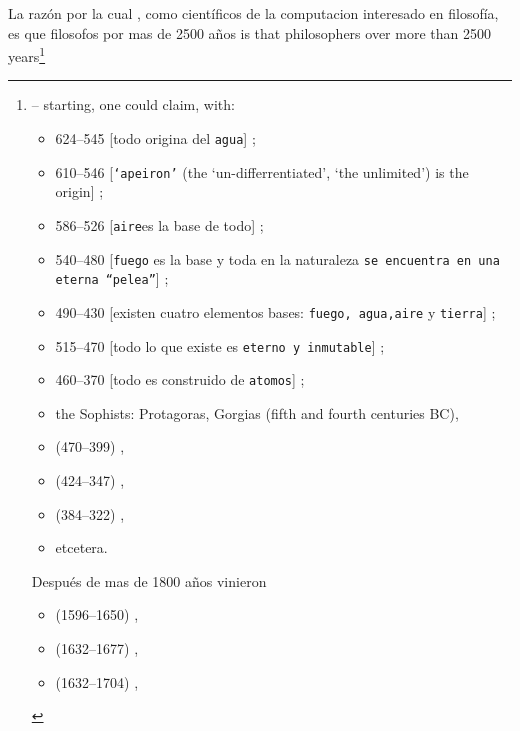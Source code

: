 \mnewfoil
      
\begynd
\pind La razón por la cual , como científicos de la computacion  interesado en filosofía,
\begynd
\pind es que filosofos por mas de 2500 años is that philosophers over more than 2500
      years{\footnote{\LLLL -- \label{citations-1}
      starting, one could claim, with:\scriptsize\footnotesize
\begin{multicols}{2}
\begin{itemize}
\item {} 624--545 [todo origina del 
      {\texttt{agua}}] \cite{Thales:Dines};
\item {} 610--546 [{\texttt{`apeiron'}} (the
      `un\--dif\-fer\-ren\-ti\-a\-ted', `the unlimited') is the
      origin] \cite{Anaximander:Dines};
\item {} 586--526 [{\texttt{aire}}es la base de todo] \cite{Anaximenes:Dines};
\item  {} 540--480 [\texttt{fuego} es la base y toda en la naturaleza {\texttt{se encuentra en una eterna ``pelea''}}]  \cite{Heraklit:Dines};
\item {} 490--430 [existen cuatro elementos bases:
      {\texttt{fuego, agua,aire}} y {\texttt{tierra}}] \cite{Empedokles:Dines};
\item {} 515--470 [todo lo que existe es \texttt{eterno y inmutable}] \cite{Parminedes:Dines};
\item {} 460--370 [todo es construido de {\texttt{atomos}}] \cite{Demokrit:Dines};
\item the Sophists: Protagoras, Gorgias (fifth and fourth centuries BC),
\item {} (470--399) \cite{Socrates:Dines},
\item {} (424--347) \cite{Plato:Dines},
\item {} (384--322) \cite{Aristotle:Dines-x},
\item etcetera.
\end{itemize}
\noindent
Después de mas de 1800 años vinieron 
\begin{itemize}
\item {} (1596--1650) \cite{Descartes:Dines},
\item {} (1632--1677) \cite{Spinoza:Dines},
\item {} (1632--1704) \cite{Locke:Dines},

\end{itemize}
\end{multicols}}}

